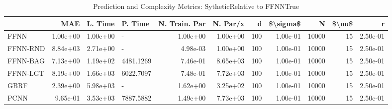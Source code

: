 \begin{table}
\centering
\caption{Prediction and Complexity Metrics: SytheticRelative to FFNNTrue}
\label{tab__Sythetic__Fix_Neurons_QTrue}
\begin{tabular}{lrrlrrrrrrr}
\toprule
{} &      MAE &  L. Time & P. Time &  N. Train. Par &  N. Par/x &    d &  \$\textbackslash sigma\$ &      N &  \$\textbackslash nu\$ &        r \\
\midrule
FFNN     & 1.00e+00 & 1.00e+00 &          - & 1.00e+00 &  1.00e+00 &  100 &  1.00e-01 &  10000 &     15 & 2.50e-01 \\
FFNN-RND & 8.84e+03 & 2.71e+00 &          - & 4.98e-03 &  1.00e+00 &  100 &  1.00e-01 &  10000 &     15 & 2.50e-01 \\
FFNN-BAG & 7.13e+00 & 1.19e+02 &  4481.1269 & 7.46e-01 &  8.65e+03 &  100 &  1.00e-01 &  10000 &     15 & 2.50e-01 \\
FFNN-LGT & 8.19e+00 & 1.66e+03 &  6022.7097 & 7.48e-01 &  7.72e+03 &  100 &  1.00e-01 &  10000 &     15 & 2.50e-01 \\
GBRF     & 2.39e+00 & 5.98e+03 &          - & 1.62e+00 &  3.25e+02 &  100 &  1.00e-01 &  10000 &     15 & 2.50e-01 \\
PCNN     & 9.65e-01 & 3.53e+03 &  7887.5882 & 1.49e+00 &  7.73e+03 &  100 &  1.00e-01 &  10000 &     15 & 2.50e-01 \\
\bottomrule
\end{tabular}
\end{table}
